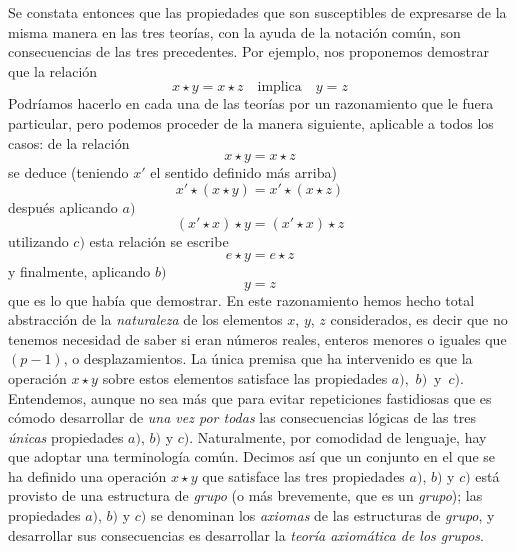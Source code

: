 \documentclass[a4paper, 12pt, draft]{article}
\begin{document}
Se constata entonces que las propiedades que son susceptibles de expresarse de la misma manera en las tres teorías, con la ayuda de la notación común, son consecuencias de las tres precedentes. Por ejemplo, nos proponemos demostrar que la relación $$ x\star y=x\star z\quad \text{implica}\quad y=z $$ Podríamos hacerlo en cada una de las teorías por un razonamiento que le fuera particular, pero podemos proceder de la manera siguiente, aplicable a todos los casos: de la relación $$ x\star y=x\star z $$ se deduce (teniendo $x'$ el sentido definido más arriba) $$ x'\star (x\star y)=x'\star (x\star z) $$ después aplicando $a)$ $$ (x'\star x)\star y=(x'\star x)\star z $$ utilizando $c)$ esta relación se escribe $$ e\star y= e\star z $$ y finalmente, aplicando $b)$ $$ y =z $$ que es lo que había que demostrar. En este razonamiento hemos hecho total abstracción de la \textit{naturaleza} de los elementos $x$, $y$, $z$ considerados, es decir que no tenemos necesidad de saber si eran números reales, enteros menores o iguales que $(p-1)$, o desplazamientos. La única premisa que ha intervenido es que la operación $x\star y$ sobre estos elementos satisface las propiedades \mbox{$a)$, $b)$ y~$c)$.} Entendemos, aunque no sea más que para evitar repeticiones fastidiosas que es cómodo desarrollar de \textit{una vez por todas} las consecuencias lógicas de las tres \textit{únicas} propiedades $a)$, $b)$ y $c)$. Naturalmente, por comodidad de lenguaje, hay que adoptar una terminología común. Decimos así que un conjunto en el que se ha definido una operación $x\star y$ que satisface las tres propiedades $a)$, $b)$ y $c)$ está provisto de una estructura de \textit{grupo} (o más brevemente, que es un \textit{grupo}); las propiedades $a)$, $b)$ y $c)$ se denominan los \textit{axiomas} de las estructuras de \textit{grupo}, y desarrollar sus consecuencias es desarrollar la \textit{teoría axiomática de los grupos}. 
\end{document}
